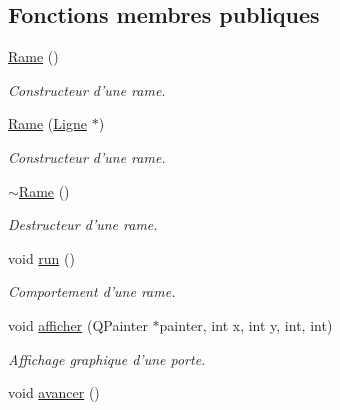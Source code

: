 \subsection*{Fonctions membres publiques}
\begin{DoxyCompactItemize}
\item 
\hypertarget{classRame_adef53f3ecf010d61beaddf3b70cff9a7}{
\hyperlink{classRame_adef53f3ecf010d61beaddf3b70cff9a7}{Rame} ()}
\label{classRame_adef53f3ecf010d61beaddf3b70cff9a7}

\begin{DoxyCompactList}\small\item\em Constructeur d'une rame. \item\end{DoxyCompactList}\item 
\hyperlink{classRame_a8066c138d427e7ae1236a563cf118c9a}{Rame} (\hyperlink{classLigne}{Ligne} $\ast$)
\begin{DoxyCompactList}\small\item\em Constructeur d'une rame. \item\end{DoxyCompactList}\item 
\hypertarget{classRame_a01b0bee8b4dd0b34e264691754a09cf9}{
\hyperlink{classRame_a01b0bee8b4dd0b34e264691754a09cf9}{$\sim$Rame} ()}
\label{classRame_a01b0bee8b4dd0b34e264691754a09cf9}

\begin{DoxyCompactList}\small\item\em Destructeur d'une rame. \item\end{DoxyCompactList}\item 
\hypertarget{classRame_a795c6b2b9c2de73d65d667fa6499356b}{
void \hyperlink{classRame_a795c6b2b9c2de73d65d667fa6499356b}{run} ()}
\label{classRame_a795c6b2b9c2de73d65d667fa6499356b}

\begin{DoxyCompactList}\small\item\em Comportement d'une rame. \item\end{DoxyCompactList}\item 
void \hyperlink{classRame_ae17128baab9f80372d1a1b6cd94ca2cd}{afficher} (QPainter $\ast$painter, int x, int y, int, int)
\begin{DoxyCompactList}\small\item\em Affichage graphique d'une porte. \item\end{DoxyCompactList}\item 
\hypertarget{classRame_a967aa23c6da624b0f7b03be6613e76c6}{
void \hyperlink{classRame_a967aa23c6da624b0f7b03be6613e76c6}{avancer} ()}
\label{classRame_a967aa23c6da624b0f7b03be6613e76c6}


\end{DoxyCompactItemize}

